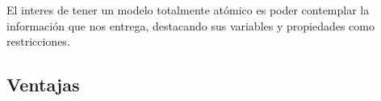     El interes de tener un modelo totalmente atómico es poder contemplar la información que nos entrega, destacando sus variables y propiedades como restricciones.



  \subsection{Ventajas }
